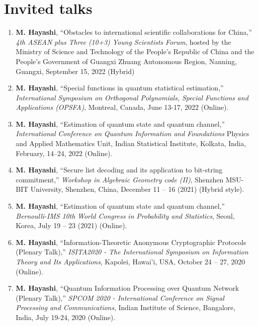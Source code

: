 \documentclass[a4paper,12pt,oneside]{article}
\begin{document}
\section{Invited talks}
\begin{enumerate}

\item 
\textbf{M. Hayashi}, 
``Obstacles to international scientific collaborations for China,'' 
{\em  4th ASEAN plus Three (10+3) Young Scientists Forum}, 
hosted by the Ministry of Science and Technology of the People’s Republic of China and 
the People’s Government of Guangxi Zhuang Autonomous Region, 
Nanning, Guangxi, September 15, 2022 (Hybrid)

\item 
\textbf{M. Hayashi}, 
``Special functions in quantum statistical estimation,'' 
{\em  International Symposium on Orthogonal Polynomials, Special Functions and Applications (OPSFA)}, 
Montreal, Canada, June 13-17, 2022 (Online).

\item 
\textbf{M. Hayashi}, 
``Estimation of quantum state and quantum channel,'' 
{\em  International Conference on Quantum Information and Foundations} Physics and Applied Mathematics Unit, 
Indian Statistical Institute, Kolkata, India, February, 14–24, 2022 (Online).

\item 
\textbf{M. Hayashi}, 
``Secure list decoding and its application to bit-string commitment,'' 
{\em  Workshop in Algebraic Geometry code (II)}, 
Shenzhen MSU-BIT University, Shenzhen, China, December 11 – 16 (2021) (Hybrid style).

\item 
\textbf{M. Hayashi}, 
``Estimation of quantum state and quantum channel,'' 
{\em  Bernoulli-IMS 10th World Congress in Probability and Statistics}, 
Seoul, Korea, July 19 – 23 (2021) (Online).

\item 
\textbf{M. Hayashi}, 
``Information-Theoretic Anonymous Cryptographic Protocols (Plenary Talk),'' 
{\em  ISITA2020 - The International Symposium on Information Theory and Its Applications}, 
Kapolei, Hawai’i, USA, October 24 -- 27, 2020 (Online). 

\item 
\textbf{M. Hayashi}, 
``Quantum Information Processing over Quantum Network (Plenary Talk),'' 
{\em  SPCOM 2020 - International Conference on Signal Processing and Communications}, 
Indian Institute of Science, Bangalore, India, July 19-24, 2020 (Online). 


\end{enumerate}
\end{document}
